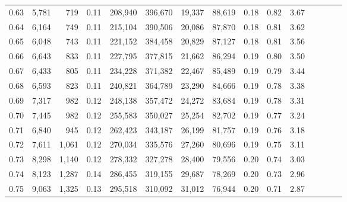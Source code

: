 \begin{tabular}{rrrcrrrrrrrrrrr}
0.63 &   5,781 &    719 &                                       0.11 &  208,940 &  396,670 &   19,337 &   88,619 &  0.18 &  0.82 &                         3.67 \\
0.64 &   6,164 &    749 &                                       0.11 &  215,104 &  390,506 &   20,086 &   87,870 &  0.18 &  0.81 &                         3.62 \\
0.65 &   6,048 &    743 &                                       0.11 &  221,152 &  384,458 &   20,829 &   87,127 &  0.18 &  0.81 &                         3.56 \\
0.66 &   6,643 &    833 &                                       0.11 &  227,795 &  377,815 &   21,662 &   86,294 &  0.19 &  0.80 &                         3.50 \\
0.67 &   6,433 &    805 &                                       0.11 &  234,228 &  371,382 &   22,467 &   85,489 &  0.19 &  0.79 &                         3.44 \\
0.68 &   6,593 &    823 &                                       0.11 &  240,821 &  364,789 &   23,290 &   84,666 &  0.19 &  0.78 &                         3.38 \\
0.69 &   7,317 &    982 &                                       0.12 &  248,138 &  357,472 &   24,272 &   83,684 &  0.19 &  0.78 &                         3.31 \\
0.70 &   7,445 &    982 &                                       0.12 &  255,583 &  350,027 &   25,254 &   82,702 &  0.19 &  0.77 &                         3.24 \\
0.71 &   6,840 &    945 &                                       0.12 &  262,423 &  343,187 &   26,199 &   81,757 &  0.19 &  0.76 &                         3.18 \\
0.72 &   7,611 &  1,061 &                                       0.12 &  270,034 &  335,576 &   27,260 &   80,696 &  0.19 &  0.75 &                         3.11 \\
0.73 &   8,298 &  1,140 &                                       0.12 &  278,332 &  327,278 &   28,400 &   79,556 &  0.20 &  0.74 &                         3.03 \\
0.74 &   8,123 &  1,287 &                                       0.14 &  286,455 &  319,155 &   29,687 &   78,269 &  0.20 &  0.73 &                         2.96 \\
0.75 &   9,063 &  1,325 &                                       0.13 &  295,518 &  310,092 &   31,012 &   76,944 &  0.20 &  0.71 &                         2.87 \\

\end{tabular}
